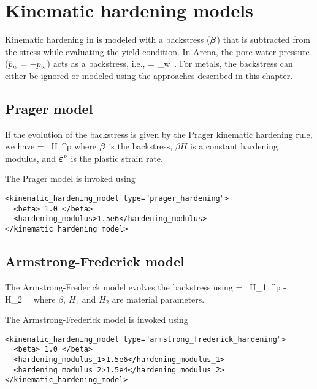 \chapter{Kinematic hardening models}
Kinematic hardening in \Vaango is modeled with a backstress ($\boldsymbol{\beta}$) that is
subtracted from the stress while evaluating the yield condition.  In Arena, the
pore water pressure ($\pbar_w = -p_w$) acts as a backstress, i.e.,
\Beq
  \Bbeta = \pbar_w \BI \,.
\Eeq
For metals, the backstress can either be ignored or modeled using the approaches described
in this chapter.

\section{Prager model}
If the evolution of the backstress is given by the Prager kinematic hardening rule, we have
\Beq
  \dot{\Bbeta} = ~\beta H~\dot{\BVeps}^p 
\Eeq
where $\boldsymbol{\beta}$ is the backstress, $\beta H$ is a constant hardening modulus, and $\dot{\boldsymbol{\varepsilon}}^p$ is
the plastic strain rate.

The Prager model is invoked using
\lstset{language=XML}
\begin{lstlisting}
<kinematic_hardening_model type="prager_hardening">
  <beta> 1.0 </beta>
  <hardening_modulus>1.5e6</hardening_modulus>
</kinematic_hardening_model>
\end{lstlisting}

\section{Armstrong-Frederick model}
The Armstrong-Frederick model evolves the backstress using
\Beq
  \dot{\Bbeta} = ~\beta H_1~\dot{\BVeps}^p - \beta H_2~\Bbeta~ 
\Eeq
where $\beta$, $H_1$ and $H_2$ are material parameters.

The Armstrong-Frederick model is invoked using
\lstset{language=XML}
\begin{lstlisting}
<kinematic_hardening_model type="armstrong_frederick_hardening">
  <beta> 1.0 </beta>
  <hardening_modulus_1>1.5e6</hardening_modulus_1>
  <hardening_modulus_2>1.5e4</hardening_modulus_2>
</kinematic_hardening_model>
\end{lstlisting}

